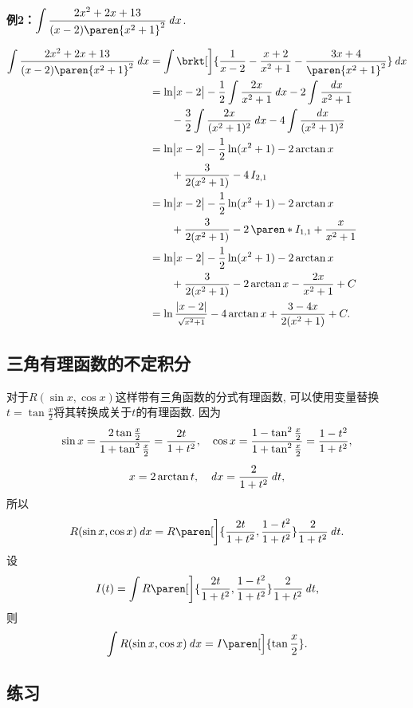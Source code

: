 \documentclass[a4paper,punct=CCT]{ctexbook}
\newcommand*{\ex}[2]{\textbf{例#1：}#2}
\newcommand*{\disp}[1]{\( \displaystyle #1 \)}
\newcommand*{\exds}[2]{\ex{#1}\disp{#2}}
\theoremstyle{break}
\newif\ifshowex
\begin{document}
\exds{2}{\int \frac{2x^2 + 2x + 13}{(x-2)\paren{x^2+1}^2} \dx}.

\begin{align*}
  \int \frac{2x^2 + 2x + 13}{(x-2)\paren{x^2+1}^2} \dx
  &= \int \brkt[\bigg]{\frac{1}{x-2} - \frac{x+2}{x^2+1} - \frac{3x+4}{\paren{x^2+1}^2}} \dx \\
  &= \ln\abs[\big]{x-2}
    - \frac12 \int \frac{2x}{x^2+1} \dx
    - 2 \int \frac{\dx}{x^2+1} \\
  &\qquad - \frac32 \int \frac{2x}{(x^2+1)^2} \dx - 4 \int \frac{\dx}{(x^2+1)^2} \\
  &= \ln\abs[\big]{x-2} - \frac12 \ln(x^2+1) - 2 \arctan x \\
  &\qquad + \frac{3}{2(x^2+1)} - 4 \, I_{2,1} \\
  &= \ln\abs[\big]{x-2} - \frac12 \ln(x^2+1) - 2 \arctan x \\
  &\qquad + \frac{3}{2(x^2+1)} - 2 \, \paren*{I_{1,1} + \frac{x}{x^2+1}} \\
  &= \ln\abs[\big]{x-2} - \frac12 \ln(x^2+1) - 2 \arctan x \\
  &\qquad + \frac{3}{2(x^2+1)} - 2 \arctan x  - \frac{2x}{x^2+1} + C \\
  &= \ln\frac{\abs{x-2}}{\scriptstyle\sqrt{x^2+1}} - 4 \arctan x + \frac{3-4x}{2(x^2+1)} + C.
\end{align*}

\subsection{三角有理函数的不定积分}

对于\(R(\sin x, \cos x)\)这样带有三角函数的分式有理函数, 可以使用变量替换\(t = \tan\frac{x}{2}\)将其转换成关于\(t\)的有理函数.  因为
\begin{gather*}
  \sin x = \frac{2\tan\frac{x}{2}}{1+\tan^2\frac{x}{2}} = \frac{2t}{1+t^2},
  \quad
  \cos x = \frac{1 - \tan^2\frac{x}{2}}{1+\tan^2\frac{x}{2}} = \frac{1-t^2}{1+t^2}, \\[1ex]
  x = 2 \arctan t,
  \quad
  \mathop{}\!\mathit{d} x = \frac{2}{1+t^2} \mathop{}\!\mathit{d} t,
\end{gather*}
所以
\[
  R(\sin x, \cos x) \dx = R\paren[\bigg]{\frac{2t}{1+t^2}, \frac{1-t^2}{1+t^2}} \frac{2}{1+t^2} \dt.
\]
设
\[
  I(t) = \int R\paren[\bigg]{\frac{2t}{1+t^2}, \frac{1-t^2}{1+t^2}} \frac{2}{1+t^2} \dt,
\]
则
\[
  \int R(\sin x, \cos x) \dx = I\paren[\Big]{\tan\frac{x}{2}}.
\]

\ifshowex
{}
\subsection*{练习}
\end{document}
